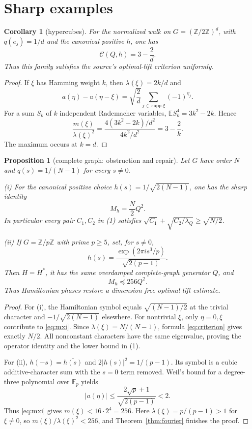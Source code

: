 \documentclass[10pt]{article}
\newtheorem{corollary}[theorem]{Corollary}
\newtheorem{proposition}[theorem]{Proposition}
\newcommand{\E}{\mathbb E}
\newcommand{\Z}{\mathbb Z}
\begin{document}
\section*{Sharp examples}

\begin{corollary}[hypercubes]\label{cor:cube}
For the normalized walk on $G=(\Z/2\Z)^d$, with $q(e_j)=1/d$ and the
canonical positive $h$, one has
\[
                         \mathcal C(Q,h)=3-\frac2d.
\]
Thus this family satisfies the source's optimal-lift criterion uniformly.
\end{corollary}

\begin{proof}
If $\xi$ has Hamming weight $k$, then $\lambda(\xi)=2k/d$ and
\[
 a(\eta)-a(\eta-\xi)=\sqrt{\frac2d}
          \sum_{j\in\operatorname{supp}\xi}(-1)^{\eta_j}.
\]
For a sum $S_k$ of $k$ independent Rademacher variables,
$\E S_k^4=3k^2-2k$.  Hence
\[
 \frac{m(\xi)}{\lambda(\xi)^2}
 =\frac{4(3k^2-2k)/d^2}{4k^2/d^2}=3-\frac2k.
\]
The maximum occurs at $k=d$.
\end{proof}

\begin{proposition}[complete graph: obstruction and repair]\label{prop:complete}
Let $G$ have order $N$ and $q(s)=1/(N-1)$ for every $s\ne0$.

\emph{(i)} For the canonical positive choice
$h(s)=1/\sqrt{2(N-1)}$, one has the sharp identity
\[
                          M_h=\frac N2Q^2.
\]
In particular every pair $C_1,C_2$ in (1) satisfies
$\sqrt{C_1}+\sqrt{C_2/\lambda_Q}\geq\sqrt{N/2}$.

\emph{(ii)} If $G=\Z/p\Z$ with prime $p\geq5$, set, for $s\ne0$,
\[
 h(s)=\frac{\exp(2\pi i s^3/p)}{\sqrt{2(p-1)}}.
\]
Then $H=H^*$, it has the same overdamped complete-graph generator $Q$, and
\[
                              M_h\preceq256Q^2.
\]
Thus Hamiltonian phases restore a dimension-free optimal-lift estimate.
\end{proposition}

\begin{proof}
For (i), the Hamiltonian symbol equals $\sqrt{(N-1)/2}$ at the trivial
character and $-1/\sqrt{2(N-1)}$ elsewhere.  For nontrivial $\xi$, only
$\eta=0,\xi$ contribute to \eqref{eq:mxi}.  Since
$\lambda(\xi)=N/(N-1)$, formula \eqref{eq:criterion} gives exactly $N/2$.
All nonconstant characters have the same eigenvalue, proving the operator
identity and the lower bound in (1).

For (ii), $h(-s)=\overline{h(s)}$ and $2|h(s)|^2=1/(p-1)$.  Its symbol is a
cubic additive-character sum with the $s=0$ term removed.  Weil's bound for a
degree-three polynomial over $\mathbb F_p$ \cite{Weil} yields
\[
 |a(\eta)|\leq\frac{2\sqrt p+1}{\sqrt{2(p-1)}}<2.
\]
Thus \eqref{eq:mxi} gives $m(\xi)<16\cdot2^4=256$.  Here
$\lambda(\xi)=p/(p-1)>1$ for $\xi\ne0$, so
$m(\xi)/\lambda(\xi)^2<256$, and Theorem~\ref{thm:fourier} finishes the proof.
\end{proof}
\end{document}
